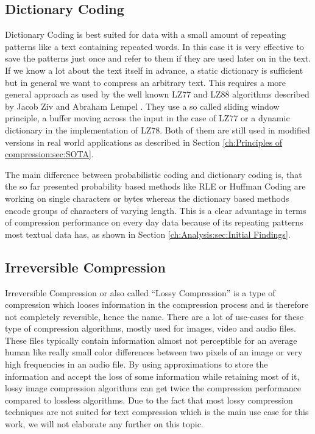 \subsection{Dictionary Coding}
\par{
Dictionary Coding is best suited for data with a small amount of repeating patterns like a text containing repeated words. In this case it is very effective to save the patterns just once and refer to them if they are used later on in the text. If we know a lot about the text itself in advance, a static dictionary is sufficient but in general we want to compress an arbitrary text. This requires a more general approach as used by the well known LZ77 and LZ88 algorithms described by Jacob Ziv and Abraham Lempel \cite{lz}. They use a so called sliding window principle, a buffer moving across the input in the case of LZ77 or a dynamic dictionary in the implementation of LZ78. Both of them are still used in modified versions in real world applications as described in Section \ref{ch:Principles of compression:sec:SOTA}.
}
\par{
The main difference between probabilistic coding and dictionary coding is, that the so far presented probability based methods like RLE or Huffman Coding are working on single characters or bytes whereas the dictionary based methods encode groups of characters of varying length. This is a clear advantage in terms of compression performance on every day data because of its repeating patterns most textual data has, as shown in Section \ref{ch:Analysis:sec:Initial Findings}.
}


\subsection{Irreversible Compression}
\par{
Irreversible Compression or also called \enquote{Lossy Compression} is a type of compression which looses information in the compression process and is therefore not completely reversible, hence the name. There are a lot of use-cases for these type of compression algorithms, mostly used for images, video and audio files. These files typically contain information almost not perceptible for an average human like really small color differences between two pixels of an image or very high frequencies in an audio file. By using approximations to store the information and accept the loss of some information while retaining most of it, lossy image compression algorithms can get twice the compression performance compared to lossless algorithms. Due to the fact that most lossy compression techniques are not suited for text compression which is the main use case for this work, we will not elaborate any further on this topic.
}


